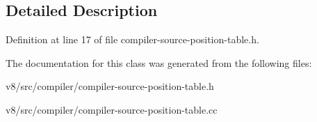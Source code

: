 \subsection{Detailed Description}


Definition at line 17 of file compiler-\/source-\/position-\/table.\+h.



The documentation for this class was generated from the following files\+:\begin{DoxyCompactItemize}
\item 
v8/src/compiler/compiler-\/source-\/position-\/table.\+h\item 
v8/src/compiler/compiler-\/source-\/position-\/table.\+cc\end{DoxyCompactItemize}
